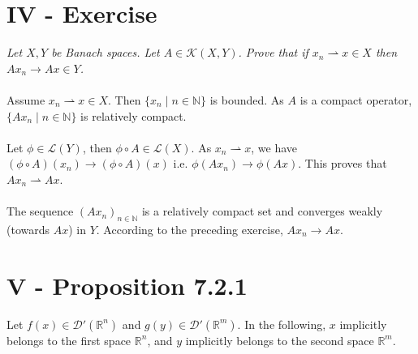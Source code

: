 \documentclass[11pt,a4paper]{article}
\newcommand{\La}{\mathcal{L}}
\newcommand{\il}{\textit}
\newcommand{\N}{\mathbb{N}}
\newcommand{\R}{\mathbb{R}}
\newcommand{\1}{\mathbbm{1}}
\begin{document}
\section*{IV - Exercise}
\il{Let $X,Y$ be Banach spaces. Let $A \in \mathcal{K}(X,Y)$. Prove that if $x_n \rightharpoonup x \in X$ then $Ax_n \to Ax \in Y$.}\\\\
Assume $x_n \rightharpoonup x \in X$. Then $\{x_n \mid n\in\N \}$ is bounded. As $A$ is a compact operator, $\{ Ax_n \mid n\in\N\}$ is relatively compact.\\\\
Let $\phi \in \La(Y)$, then $\phi \circ A \in \La(X)$. As $x_n \rightharpoonup x$, we have $(\phi \circ A)(x_n) \to (\phi \circ A)(x)$ i.e. $\phi(Ax_n) \to \phi(Ax)$. This proves that $Ax_n \rightharpoonup Ax$.\\\\
The sequence $(Ax_n)_{n\in\N}$ is a relatively compact set and converges weakly (towards $Ax$) in $Y$. According to the preceding exercise, $Ax_n \to Ax$.\newpage

\section*{V - Proposition 7.2.1}
Let $f(x) \in \mathcal{D}'(\R^n)$ and $g(y) \in \mathcal{D}'(\R^m)$. In the following, $x$ implicitly belongs to the first space $\R^n$, and $y$ implicitly belongs to the second space $\R^m$.
\end{document}
